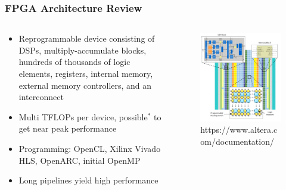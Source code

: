 \documentclass{beamer}
\begin{document}
\begin{frame}
  \frametitle{FPGA Architecture Review}
  \begin{columns}
    \begin{column}{0.5\textwidth}
      \begin{itemize}
        \item Reprogrammable device consisting of DSPs, multiply-accumulate blocks, hundreds of
          thousands of logic elements, registers, internal memory, external memory controllers, and an interconnect
        \item Multi TFLOPs per device, possible$^{*}$ to get near peak performance
        \item Programming: OpenCL, Xilinx Vivado HLS, OpenARC, initial OpenMP
        \item Long pipelines yield high performance
      \end{itemize}
    \end{column}
    \begin{column}{0.5\textwidth}
      \begin{figure}
        \centering
        \includegraphics[width=\textwidth]{figures/fpga.png}
        {\tiny https://www.altera.com/documentation/}
      \end{figure}  
    \end{column}
  \end{columns}
\end{frame}
\end{document}

